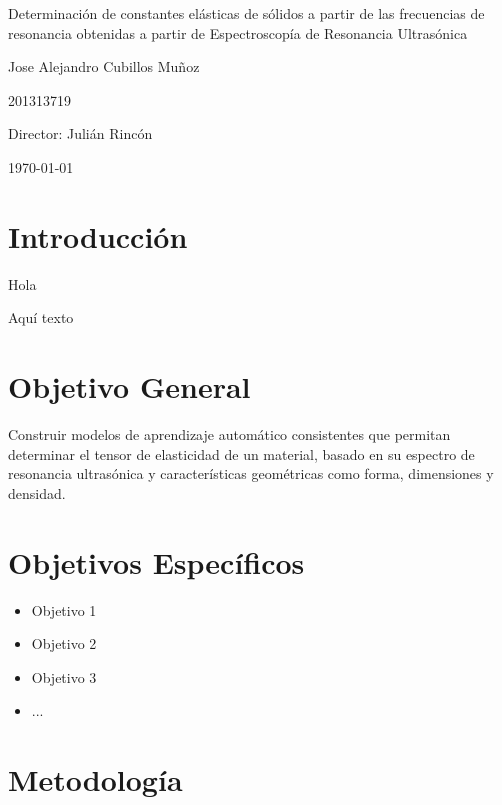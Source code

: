 \documentclass[12pt]{article}
\begin{document}
\begin{center}
\Huge
Determinación de constantes elásticas de sólidos a partir de las frecuencias de resonancia obtenidas a partir de Espectroscopía de Resonancia Ultrasónica

\vspace{3mm}
\Large Jose Alejandro Cubillos Muñoz

\large
201313719


\vspace{2mm}
\Large
Director: Julián Rincón

\normalsize
\vspace{2mm}

\today
\end{center}


\normalsize
\section{Introducción}
Hola \cite{Leisure_1997}

Aquí texto

\section{Objetivo General}

Construir modelos de aprendizaje automático consistentes que permitan determinar el tensor de elasticidad de un material, basado en su espectro de resonancia ultrasónica y características geométricas como forma, dimensiones y densidad.
\section{Objetivos Específicos}


\begin{itemize}
	\item Objetivo 1
	\item Objetivo 2
	\item Objetivo 3
	\item ...
\end{itemize}

\section{Metodología}
\end{document}
